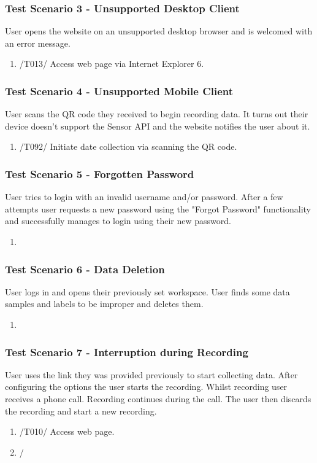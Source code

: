 \subsubsection{Test Scenario 3 - Unsupported Desktop Client}
User opens the website on an unsupported desktop browser and is welcomed with an error message.
\begin{enumerate}
    \item /T013/ Access web page via Internet Explorer 6.
\end{enumerate} 
\subsubsection{Test Scenario 4 - Unsupported Mobile Client}
User scans the QR code they received to begin recording data. It turns out their device doesn't support the Sensor API and the website notifies the user about it.
\begin{enumerate}
    \item /T092/ Initiate date collection via scanning the QR code.
\end{enumerate}
\subsubsection{Test Scenario 5 - Forgotten Password}
User tries to login with an invalid username and/or password. After a few attempts user requests a new password using the "Forgot Password" functionality and successfully manages to login using their new password.
\begin{enumerate}
    \item 
\end{enumerate} 
\subsubsection{Test Scenario 6 - Data Deletion} 
User logs in and opens their previously set workspace. User finds some data samples and labels to be improper and deletes them.
\begin{enumerate}
    \item 
\end{enumerate}
\subsubsection{Test Scenario 7 - Interruption during Recording}
User uses the link they was provided previously to start collecting data. After configuring the options the user starts the recording. Whilst recording user receives a phone call. Recording continues during the call. The user then discards the recording and start a new recording. 
\begin{enumerate}
    \item /T010/ Access web page.
    \item /
\end{enumerate}
